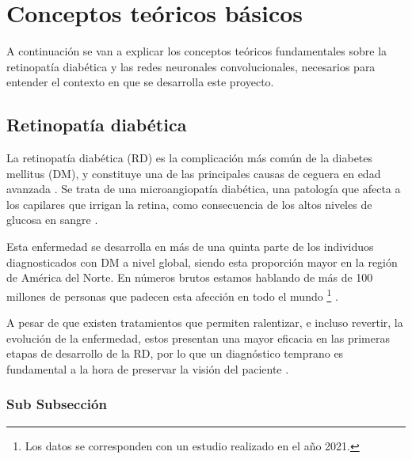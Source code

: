 \titlespacing{\section}{0pt}{0.25cm}{0.15cm}
\section{Conceptos teóricos básicos}

A continuación se van a explicar los conceptos teóricos fundamentales sobre la retinopatía diabética y las redes neuronales convolucionales, necesarios para entender el contexto en que se desarrolla este proyecto.

\titlespacing{\subsection}{0pt}{0.25cm}{0.15cm}
\subsection{Retinopatía diabética}

La retinopatía diabética (RD) es la complicación más común de la diabetes mellitus (DM), y constituye una de las principales causas de ceguera en edad avanzada \cite{diabetes:JDI, retinopatia:Retinal_and_eye}. Se trata de una microangiopatía diabética, una patología que afecta a los capilares que irrigan la retina, como consecuencia de los altos niveles de glucosa en sangre \cite{retinopatia:chile}.

Esta enfermedad se desarrolla en más de una quinta parte de los individuos diagnosticados con DM a nivel global, siendo esta proporción mayor en la región de América del Norte. En números brutos estamos hablando de más de 100 millones de personas que padecen esta afección en todo el mundo \footnote{Los datos se corresponden con un estudio realizado en el año 2021.} \cite{retinopatia:ophtalmology}.

A pesar de que existen tratamientos que permiten ralentizar, e incluso revertir, la evolución de la enfermedad, estos presentan una mayor eficacia en las primeras etapas de desarrollo de la RD, por lo que un diagnóstico temprano es fundamental a la hora de preservar la visión del paciente \cite{diabetes:JDI}.

\subsubsection{Sub Subsección}

